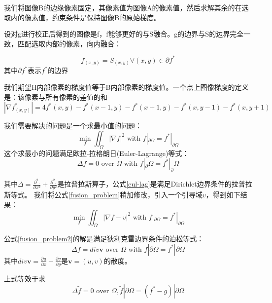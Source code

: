 我们将图像B的边缘像素固定，其像素值为图像A的像素值，然后求解其余的在选取内的像素值，约束条件是保持图像B的原始梯度。

设对g进行校正后得到的图像是f，f能够更好的与S融合。g的边界与S的边界完全一致，匹配选取内部的像素，向内融合：

\begin{equation}
f_{(x,y)} = S_{(x,y)}\forall{(x,y)}\in{\partial{f^*}}
\end{equation}
其中\(\partial{f^*}\)表示\(f^*\)的边界

我们期望H内部像素的梯度值等于B内部像素的梯度值。一个点上图像梯度的定义是：该像素与所有像素的差值的和
\begin{equation}
|\nabla{f^*_{(x,y)}}| = 4f^*(x,y) - f^*(x-1,y) - f^*(x+1,y) - f^*(x,y-1) - f^*(x,y+1)
\end{equation}

我们需要解决的问题是一个求最小值的问题：
\begin{equation}
\mathop {min}\limits_{f}\iint_{\Omega}^{} |\nabla{f}|^2\text{ with }f|_{\partial\Omega} = f^*|_{\partial\Omega}
\label{fusion_problem}
\end{equation}
这个求最小的问题满足欧拉-拉格朗日(Euler-Lagrange)等式：
\begin{equation}
\Delta f = 0\text{ over }\Omega\text{ with }f|_\partial{\Omega} = f^*|_\partial{\Omega}
\label{eul-lag}
\end{equation}

其中\(\Delta = \frac{\partial^2.}{\partial{x^2}}+\frac{\partial^2.}{\partial{y^2}}\)是拉普拉斯算子，公式\eqref{eul-lag}是满足Dirichlet边界条件的拉普拉斯等式。
我们将公式\eqref{fusion_problem}稍加修改，引入一个引导域\(v\)，得到如下结果：
\begin{equation}
\mathop {min}\limits_{f}\iint_{\Omega}^{} |\nabla{f} - v|^2\text{ with }f|_{\partial\Omega} = f^*|_{\partial\Omega}
\label{fusion_problem2}
\end{equation}

公式\eqref{fusion_problem2}的解是满足狄利克雷边界条件的泊松等式：
\begin{equation}
\Delta f = div\mathbf{v}\text{ over }\Omega\text{ with }f|\partial{\Omega} = f^*|\partial{\Omega}
\label{poi_equ}
\end{equation}
其中\(div\mathbf{v} = \frac{\partial u}{\partial x}+\frac{\partial v}{\partial y}\)是\(\mathbf{v} = (u,v)\)的散度。

上式等效于求
\begin{equation}
\Delta \tilde{f} = 0\text{ over }\Omega,\tilde{f}|\partial{\Omega} = (f^* - g)|\partial{\Omega}
\label{poi_equ}
\end{equation}

